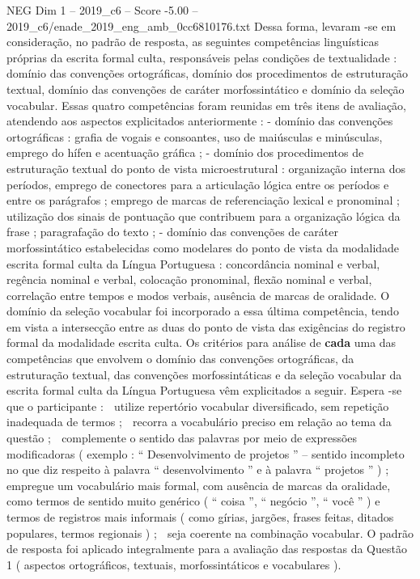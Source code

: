 \begin{textsample}{NEG Dim 1 – 2019\_c6 – Score -5.00 – 2019\_c6/enade\_2019\_eng\_amb\_0cc6810176.txt}
Dessa forma, levaram -se em consideração, no padrão de resposta, as seguintes competências linguísticas próprias da escrita formal culta, responsáveis pelas condições de textualidade : domínio das convenções ortográficas, domínio dos procedimentos de estruturação textual, domínio das convenções de caráter morfossintático e domínio da seleção vocabular.
Essas quatro competências foram reunidas em três itens de avaliação, atendendo aos aspectos explicitados anteriormente : - domínio das convenções ortográficas : grafia de vogais e consoantes, uso de maiúsculas e minúsculas, emprego do hífen e acentuação gráfica ; - domínio dos procedimentos de estruturação textual do ponto de vista microestrutural : organização interna dos períodos, emprego de conectores para a articulação lógica entre os períodos e entre os parágrafos ; emprego de marcas de referenciação lexical e pronominal ; utilização dos sinais de pontuação que contribuem para a organização lógica da frase ; paragrafação do texto ; - domínio das convenções de caráter morfossintático estabelecidas como modelares do ponto de vista da modalidade escrita formal culta da Língua Portuguesa : concordância nominal e verbal, regência nominal e verbal, colocação pronominal, flexão nominal e verbal, correlação entre tempos e modos verbais, ausência de marcas de oralidade.
O domínio da seleção vocabular foi incorporado a essa última competência, tendo em vista a intersecção entre as duas do ponto de vista das exigências do registro formal da modalidade escrita culta.
Os critérios para análise de \textbf{cada} uma das competências que envolvem o domínio das convenções ortográficas, da estruturação textual, das convenções morfossintáticas e da seleção vocabular da escrita formal culta da Língua Portuguesa vêm explicitados a seguir.
Espera -se que o participante :  utilize repertório vocabular diversificado, sem repetição inadequada de termos ;  recorra a vocabulário preciso em relação ao tema da questão ;  complemente o sentido das palavras por meio de expressões modificadoras ( exemplo : “ Desenvolvimento de projetos ” – sentido incompleto no que diz respeito à palavra “ desenvolvimento ” e à palavra “ projetos ” ) ;  empregue um vocabulário mais formal, com ausência de marcas da oralidade, como termos de sentido muito genérico ( “ coisa ”, “ negócio ”, “ você ” ) e termos de registros mais informais ( como gírias, jargões, frases feitas, ditados populares, termos regionais ) ;  seja coerente na combinação vocabular.
O padrão de resposta foi aplicado integralmente para a avaliação das respostas da Questão 1 ( aspectos ortográficos, textuais, morfossintáticos e vocabulares ).

\end{textsample}
